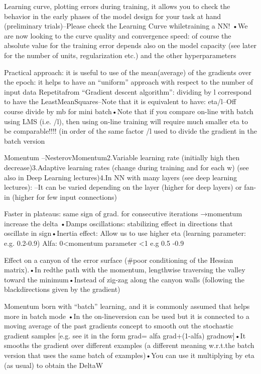 Learning curve, plotting errors during training, it allows you to check the behavior in the early phases of the model design for your task at hand (preliminary trials)–Please check the Learning Curve whiletraining a NN! •We are now looking to the curve quality and convergence speed: of course the absolute value for the training error depends also on the model capacity (see later for the number of units, regularization etc.) and the other hyperparameters

Practical approach: it is useful to use of the mean(average) of the gradients over the epoch: it helps to have an “uniform” approach with respect to the number of input data
Repetitafrom “Gradient descent algorithm”: dividing by l  correspond to have the LeastMeanSquares–Note that it is equivalent to  have: eta/l–Off course divide by mb for mini batch•Note that if you compare on-line with batch using LMS (i.e. /l), then using on-line training will require much smaller eta to be comparable!!!! (in order of the same factor /l used to divide the gradient in the batch version

Momentum –NesterovMomentum2.Variable learning rate (initially high then decrease)3.Adaptive learning rates (change during training and for each w) (see also in Deep Learning  lectures)4.In NN with many layers (see deep learning lectures): –It can be varied depending on the layer (higher for deep layers) or fan-in (higher for few input connections)

Faster in plateaus: same sign of grad. for consecutive iterations →momentum increase the delta •Damps oscillations: stabilizing effect in directions that oscillate in sign•Inertia effect: Allow us to use higher eta (learning parameter: e.g. 0.2-0.9)
Alfa: 0<momentum parameter <1 e.g 0.5 -0.9

Effect on a canyon of the error surface (#poor conditioning of the Hessian matrix).•In redthe path with the momentum, lengthwise traversing the valley toward the minimum•Instead of zig-zag along the canyon walls (following the blackdirections given by the gradient)

Momentum born with “batch” learning, and it is commonly assumed that helps more in  batch mode •In the on-lineversion can be used but it is connected to a moving average of the past gradients concept to smooth out the stochastic gradient samples [e.g. see it in the form grad= alfa grad+(1-alfa) gradnow]•It smooths the gradient over different examples (a different meaning w.r.t.the batch version that uses the same batch of examples)•You can use it multiplying by eta (as usual) to obtain the  DeltaW

